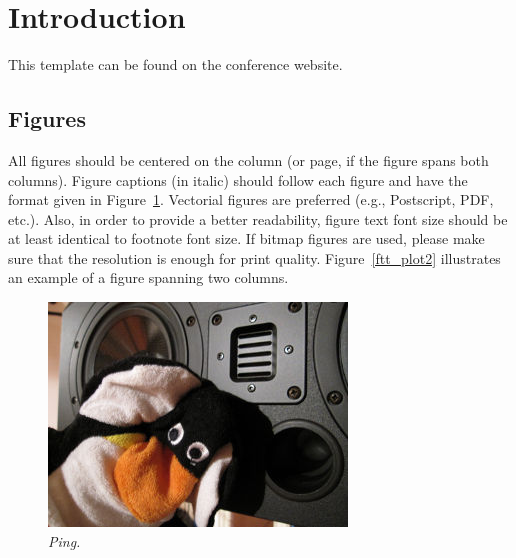 \documentclass[a4paper]{article}
\title{\papertitle}
\affiliation{
\paperauthorA}
{\href{https://www.mat.ucsb.edu/}{Department of Media Arts \& Technology} \\
\href{https://www.ucsb.edu}{University of California Santa Barbara, USA} \\
{\tt \href{mailto:joel@jaffesd.com}{joel@jaffesd.com}}
}
\newif\ifpdf
\begin{document}
\ifpdf %
  \DeclareGraphicsExtensions{.png,.jpg,.pdf}
\else  %
\fi

\maketitle

\begin{abstract}
This paper introduces a novel plugin architecture, the LPA (Light\-weight Plugin Architecture) plugin. 
The development of such an architecture is motivated by the expansive, duplicitous scope of existing audio plugin architectures, which are narrowly focused on deployment in Digital Audio Workstation software. 
In contrast, the LPA plugin is designed to run in the widest possible variety of contexts, from bare-metal embedded systems to the web and everything between. 
This is achieved by limiting the scope of the architecture to strictly perform DSP and provide basic control- no GUI, networking, licensing or other “accoutrement” tooling found in traditional plugin architectures.
\end{abstract}

\section{Introduction}
\label{sec:intro}

This template can be found on the conference website.

\subsection{Figures}
\label{ssec:figures}

All figures should be centered on the column (or page, if the figure spans both
columns). Figure captions (in italic) should follow each figure and have the
format given in Figure~\ref{fft_plot}. Vectorial figures are preferred (e.g.,
Postscript, PDF, etc.). Also, in order to provide a better readability, figure
text font size should be at least identical to footnote font size. If bitmap
figures are used, please make sure that the resolution is enough for print
quality. Figure~\ref{ftt_plot2} illustrates an example of a figure spanning two
columns.

\begin{figure}[ht]
\centerline{\includegraphics[scale=0.5]{figures/ping}}
\caption{\label{fft_plot}{\it Ping.}}
\end{figure}
\end{document}
